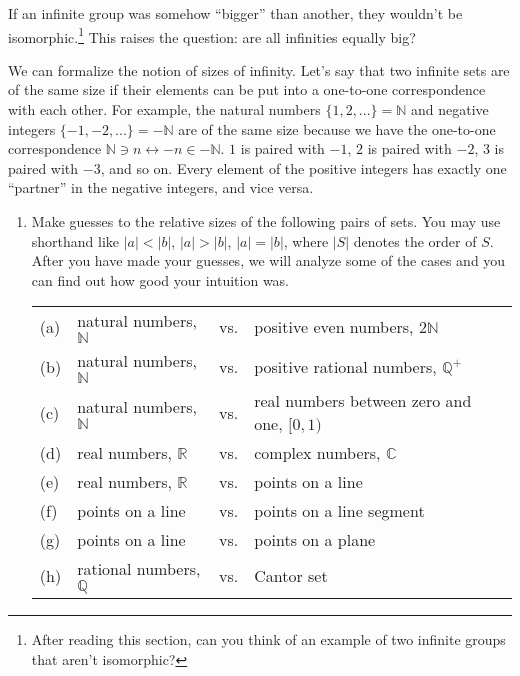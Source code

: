 \documentclass[../textbook.tex]{subfiles}
\begin{document}
\noindent If an infinite group was somehow ``bigger'' than another, they wouldn't be isomorphic.\footnote{After reading this section, can you think of an example of two infinite groups that aren't isomorphic?} This raises the question: are all infinities equally big?

We can formalize the notion of sizes of infinity. Let's say that two infinite sets are of the same size if their elements can be put into a one-to-one correspondence with each other. For example, the natural numbers $\{1,2,...\}=\mathbb{N}$ and negative integers $\{-1,-2,...\}=-\mathbb{N}$ are of the same size because we have the one-to-one correspondence $\mathbb{N} \ni n\leftrightarrow -n \in -\mathbb{N}$. $1$ is paired with $-1$, $2$ is paired with $-2$, $3$ is paired with $-3$, and so on. Every element of the positive integers has exactly one ``partner'' in the negative integers, and vice versa.

\begin{enumerate}
\setcounter{enumi}{\value{problem_i}}
\item Make guesses to the relative sizes of the following pairs of sets. You may use shorthand like $|a| < |b|$, $|a| > |b|$, $|a| = |b|$, where $|S|$ denotes the order of $S$. After you have made your guesses, we will analyze some of the cases and you can find out how good your intuition was.~\label{prob:infinity_guesses}

\begin{tabular}{llll} %
(a) & natural numbers, $\mathbb{N}$ & vs. & positive even numbers, $2\mathbb{N}$ \\
(b) & natural numbers, $\mathbb{N}$ & vs. & positive rational numbers, $\mathbb{Q}^+$ \\
(c) & natural numbers, $\mathbb{N}$ & vs. & real numbers between zero and one, $[0,1)$ \\
(d) & real numbers, $\mathbb{R}$ & vs. & complex numbers, $\mathbb{C}$ \\
(e) & real numbers, $\mathbb{R}$ & vs. & points on a line \\
(f) & points on a line & vs. & points on a line segment \\
(g) & points on a line & vs. & points on a plane \\
(h) & rational numbers, $\mathbb{Q}$ & vs. & Cantor set\footnotemark
\end{tabular}

\setcounter{problem_i}{\value{enumi}}
\end{enumerate}
\end{document}
